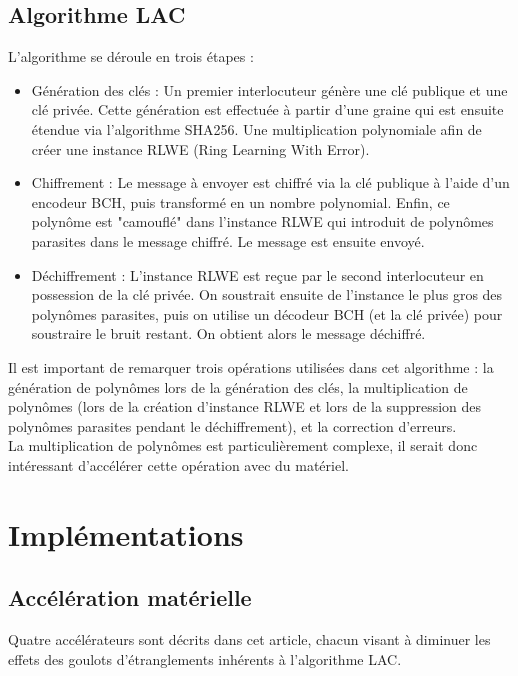 \documentclass[10pt,a4paper]{article}
\begin{document}
\subsection{Algorithme LAC}
L'algorithme se déroule en trois étapes :
\begin{itemize}
    \item Génération des clés : Un premier interlocuteur génère une clé publique et une clé privée. Cette génération est effectuée à partir d'une graine qui est ensuite étendue via l'algorithme
SHA256. Une multiplication polynomiale afin de créer une instance RLWE (Ring Learning With Error).
    \item Chiffrement : Le message à envoyer est chiffré via la clé publique à l'aide d'un encodeur BCH, puis transformé en un nombre polynomial. Enfin, ce polynôme est "camouflé" dans l'instance 
RLWE qui introduit de polynômes parasites dans le message chiffré. Le message est ensuite envoyé.
    \item Déchiffrement : L'instance RLWE est reçue par le second interlocuteur en possession de la clé privée. On soustrait ensuite de l'instance le plus gros des polynômes parasites, puis on 
utilise un décodeur BCH (et la clé privée) pour soustraire le bruit restant. On obtient alors le message déchiffré.
\end{itemize}
Il est important de remarquer trois opérations utilisées dans cet algorithme : la génération de polynômes lors de la génération des clés, la multiplication de polynômes (lors de la création d'instance 
RLWE et lors de la suppression des polynômes parasites pendant le déchiffrement), et la correction d'erreurs.\\
La multiplication de polynômes est particulièrement complexe, il serait donc intéressant d'accélérer cette opération avec du matériel.

\section{Implémentations}
\subsection{Accélération matérielle}
Quatre accélérateurs sont décrits dans cet article, chacun visant à diminuer les effets des goulots d'étranglements inhérents à l'algorithme LAC.
\end{document}
